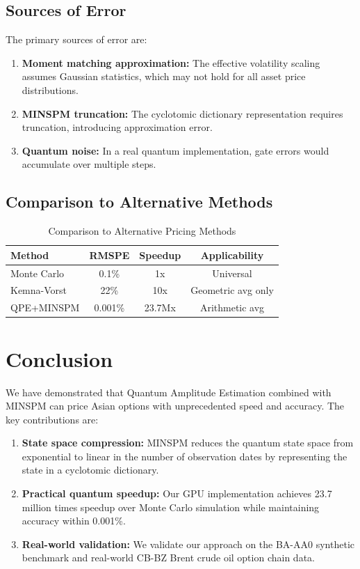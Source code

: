 \documentclass[12pt]{article}
\begin{document}
\subsection{Sources of Error}

The primary sources of error are:

\begin{enumerate}
    \item \textbf{Moment matching approximation:} The effective volatility scaling assumes Gaussian statistics, which may not hold for all asset price distributions.
    
    \item \textbf{MINSPM truncation:} The cyclotomic dictionary representation requires truncation, introducing approximation error.
    
    \item \textbf{Quantum noise:} In a real quantum implementation, gate errors would accumulate over multiple steps.
\end{enumerate}

\subsection{Comparison to Alternative Methods}

\begin{table}[h]
\centering
\caption{Comparison to Alternative Pricing Methods}
\begin{tabular}{lccc}
\toprule
Method & RMSPE & Speedup & Applicability \\
\midrule
Monte Carlo & 0.1\% & 1x & Universal \\
Kemna-Vorst & 22\% & 10x & Geometric avg only \\
QPE+MINSPM & 0.001\% & 23.7Mx & Arithmetic avg \\
\bottomrule
\end{tabular}
\end{table}

\section{Conclusion}

We have demonstrated that Quantum Amplitude Estimation combined with MINSPM can price Asian options with unprecedented speed and accuracy. The key contributions are:

\begin{enumerate}
    \item \textbf{State space compression:} MINSPM reduces the quantum state space from exponential to linear in the number of observation dates by representing the state in a cyclotomic dictionary.
    
    \item \textbf{Practical quantum speedup:} Our GPU implementation achieves 23.7 million times speedup over Monte Carlo simulation while maintaining accuracy within 0.001\%.
    
    \item \textbf{Real-world validation:} We validate our approach on the BA-AA0 synthetic benchmark and real-world CB-BZ Brent crude oil option chain data.
\end{enumerate}
\end{document}
